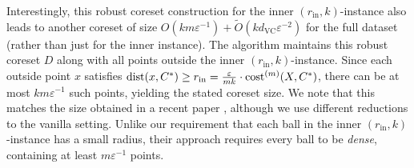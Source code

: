 \documentclass[11pt,letterpaper]{article}
\theoremstyle{definition}
\renewcommand{\epsilon}{\varepsilon}
\newcommand{\VC}{\ensuremath{\mathrm{VC}}}
\newcommand{\inn}{{\mathrm{in}}}
\DeclareMathOperator{\dist}{dist}
\begin{document}
Interestingly, this robust coreset construction for the inner \((r_{\inn},k)\)-instance also leads to another coreset of size \(O(km \epsilon^{-1}) + \tilde{O}(k d_{\VC} \epsilon^{-2})\) for the full dataset (rather than just for the inner instance). 
%
The algorithm maintains this robust coreset \(D\) along with all points outside the inner \((r_{\inn},k)\)-instance.
%
Since each outside point \(x\) satisfies \(\dist(x, C^\ast) \geq r_{\inn} = \frac{\epsilon}{mk} \cdot \cost[m](X, C^\ast)\), there can be at most \(km \epsilon^{-1}\) such points, yielding the stated coreset size. 
%
We note that this matches the size obtained in a recent paper \cite{jiang2025coresets}, although we use different reductions to the vanilla setting. 
%
Unlike our requirement that each ball in the inner \((r_{\inn},k)\)-instance has a small radius, their approach requires every ball to be \emph{dense}, containing at least \(m \epsilon^{-1}\) points.
\end{document}
